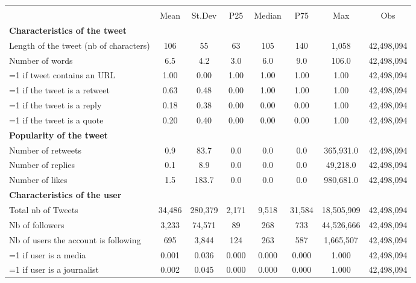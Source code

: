 {
\def\sym#1{\ifmmode^{#1}\else\(^{#1}\)\fi}
\begin{tabular}{l*{1}{ccccccc}}
\hline\hline
                    &\multicolumn{7}{c}{}                                                                      \\
                    &        Mean&      St.Dev&         P25&      Median&         P75&         Max&         Obs\\
\hline
\textbf{Characteristics of the tweet}&            &            &            &            &            &            &            \\
Length of the tweet (nb of characters)&         106&          55&          63&         105&         140&       1,058&  42,498,094\\
Number of words     &         6.5&         4.2&         3.0&         6.0&         9.0&       106.0&  42,498,094\\
=1 if tweet contains an URL&        1.00&        0.00&        1.00&        1.00&        1.00&        1.00&  42,498,094\\
=1 if the tweet is a retweet&        0.63&        0.48&        0.00&        1.00&        1.00&        1.00&  42,498,094\\
=1 if the tweet is a reply&        0.18&        0.38&        0.00&        0.00&        0.00&        1.00&  42,498,094\\
=1 if the tweet is a quote&        0.20&        0.40&        0.00&        0.00&        0.00&        1.00&  42,498,094\\
\textbf{Popularity of the tweet}&            &            &            &            &            &            &            \\
Number of retweets  &         0.9&        83.7&         0.0&         0.0&         0.0&   365,931.0&  42,498,094\\
Number of replies   &         0.1&         8.9&         0.0&         0.0&         0.0&    49,218.0&  42,498,094\\
Number of likes     &         1.5&       183.7&         0.0&         0.0&         0.0&   980,681.0&  42,498,094\\
\textbf{Characteristics of the user}&            &            &            &            &            &            &            \\
Total nb of Tweets  &      34,486&     280,379&       2,171&       9,518&      31,584&  18,505,909&  42,498,094\\
Nb of followers     &       3,233&      74,571&          89&         268&         733&  44,526,666&  42,498,094\\
Nb of users the account is following&         695&       3,844&         124&         263&         587&   1,665,507&  42,498,094\\
=1 if user is a media&       0.001&       0.036&       0.000&       0.000&       0.000&       1.000&  42,498,094\\
=1 if user is a journalist&       0.002&       0.045&       0.000&       0.000&       0.000&       1.000&  42,498,094\\
\hline\hline
\end{tabular}
}
